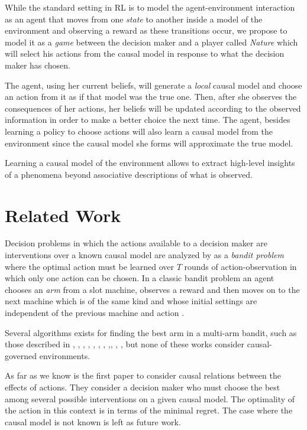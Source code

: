 \documentclass{article}
\begin{document}
While the standard setting in RL is to model the agent-environment interaction as an agent that moves from one \textit{state} to another inside a model of the environment and observing a reward as these transitions occur, we propose to model it as a \textit{game} between the decision maker and a player called \textit{Nature} which will select his actions from the causal model in response to what the decision maker has chosen. 

The agent, using her current beliefs, will generate a \textit{local} causal model and choose an action from it as if that model was the true one. Then, after she observes the consequences of her actions, her beliefs will be updated according to the observed information in order to make a better choice the next time. The agent, besides learning a policy to choose actions will also learn a causal model from the environment since the causal model she forms will approximate the true model.

Learning a causal model of the environment allows to extract high-level insights of a phenomena beyond associative descriptions of what is observed.

\section{Related Work}
Decision problems in which the actions available to a decision maker are interventions over a known causal model are analyzed by \cite{lattimoreNIPS2016} as a \textit{bandit problem} where the optimal action must be learned over $T$ rounds of action-observation in which only one action can be chosen. In a classic bandit problem an agent chooses an \textit{arm} from a slot machine, observes a reward and then moves on to the next machine which is of the same kind and whose initial settings are independent of the previous machine and action \cite{sutton1998reinforcement}.

Several algorithms exists for finding the best arm in a multi-arm bandit, such as those described in \cite{bubeck2009pure}, \cite{audibert2010best}, \cite{gabillon2012best}, \cite{agarwal2014taming} , \cite{jamieson2014lil},  \cite{jamieson2014best},  \cite{ortega2014generalized}, \cite{chen2015optimal},\cite{carpentier2016tight}, \cite{russo2016simple},  \cite{kaufmann2016complexity}, but none of these works consider causal-governed environments.

As far as we know \cite{lattimoreNIPS2016} is the first paper to consider causal relations between the effects of actions. They consider a decision maker who must choose the best among several possible interventions on a given causal model. The optimality of the action in this context is in terms of the minimal regret. The case where the causal model is not known is left as future work.
\end{document}
